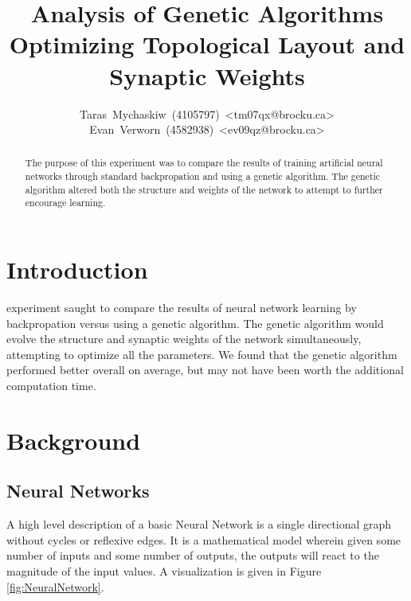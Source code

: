 \documentclass[journal]{IEEEtran}
\begin{document}
\title{Analysis of Genetic Algorithms Optimizing Topological Layout and Synaptic Weights }

\author{Taras~Mychaskiw~(4105797)~\textless{}tm07qx@brocku.ca\textgreater\\%
Evan~Verworn~(4582938)~\textless{}ev09qz@brocku.ca\textgreater%
}


\maketitle

\begin{abstract}
  The purpose of this experiment was to compare the results of training artificial neural networks
  through standard backpropation and using a genetic algorithm. The genetic algorithm altered both
  the structure and weights of the network to attempt to further encourage learning.
\end{abstract}

\IEEEpeerreviewmaketitle

\section{Introduction}
 experiment saught to compare the results of neural network learning by backpropation
versus using a genetic algorithm. The genetic algorithm would evolve the structure and synaptic weights
of the network simultaneously, attempting to optimize all the parameters. We found that the genetic algorithm
performed better overall on average, but may not have been worth the additional computation time.

\section{Background}
  \subsection{Neural Networks}
  A high level description of a basic Neural Network is a single directional graph without
  cycles or reflexive edges. It is a mathematical model wherein given some number of inputs
  and some number of outputs, the outputs will react to the magnitude of the input values. A
  visualization is given in Figure \ref{fig:NeuralNetwork}.
\end{document}

